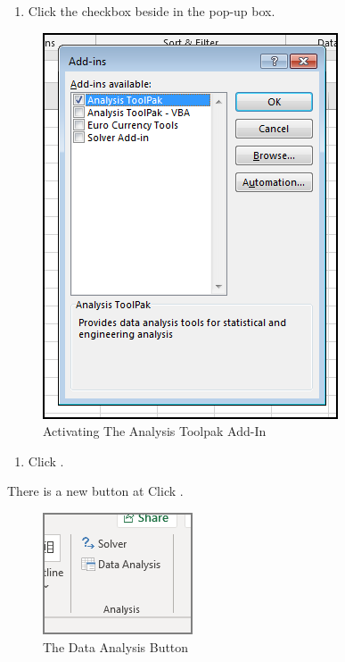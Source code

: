 \begin{enumerate}[resume]	
	
	\item Click the checkbox beside  in the  pop-up box.
	
\end{enumerate}

\begin{figure}[H]
	\centering
	\includegraphics[width=\maxwidth{.95\linewidth}]{gfx/ch09_fig52}
	\caption{Activating The Analysis Toolpak Add-In}
	\label{09:fig52}
\end{figure}

\begin{enumerate}[resume]	
	\item Click .
\end{enumerate}

There is a new button at Click .

\begin{figure}[H]
	\centering
	\includegraphics[width=\maxwidth{.95\linewidth}]{gfx/ch09_fig53}
	\caption{The Data Analysis Button}
	\label{09:fig53}
\end{figure}

